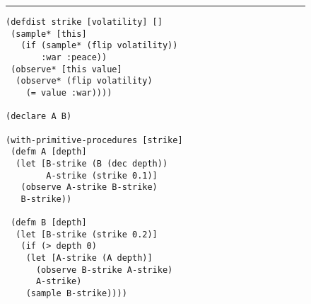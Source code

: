 \begin{figure}[t]
		\centering	
\rule{\linewidth}{0.4pt}
\vspace{-28pt}		
		\begin{lstlisting}[basicstyle=\ttfamily\footnotesize,multicols=2,frame=none]
(defdist strike [volatility] []
 (sample* [this] 
   (if (sample* (flip volatility)) 
       :war :peace))
 (observe* [this value] 
  (observe* (flip volatility) 
    (= value :war))))
  
(declare A B)

(with-primitive-procedures [strike]
 (defm A [depth]
  (let [B-strike (B (dec depth))
        A-strike (strike 0.1)]
   (observe A-strike B-strike)
   B-strike))
   
 (defm B [depth]
  (let [B-strike (strike 0.2)]
   (if (> depth 0)
    (let [A-strike (A depth)]
      (observe B-strike A-strike)
      A-strike)
    (sample B-strike))))


\end{lstlisting}
\end{figure}
